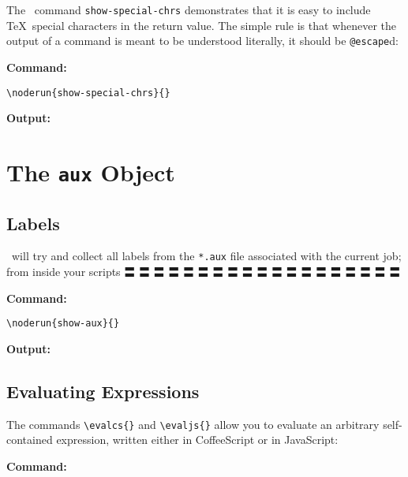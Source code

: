 \documentclass[a4paper]{article}
\makeatletter
\newenvironment{jzrplain}{%
  \lineskiplimit=-10pt%
  \lineskip=0pt%
  \topskip=0pt%
  \setlength{\parskip}{4mm}%
  \setlength{\parindent}{0mm}%
  \leading{4mm}
  }%
  {\par}
\makeatother
\begin{document}
\begin{jzrplain}
The \CXLTX\ command \verb#show-special-chrs# demonstrates that it is easy to include \TeX\ special characters
in the return value. The simple rule is that whenever the output of a command is meant to be understood
literally, it should be \verb#@escape#d:

{\textbf{Command:}}

\begin{verbatim}
\noderun{show-special-chrs}{}
\end{verbatim}

{\textbf{Output:}}



\clearpage\section{The \texttt{aux} Object}\label{aux}



\subsection{Labels}\label{labels}

\CXLTX\ will try and collect all labels from the \verb#*.aux# file associated with the current job; from
inside your scripts 〓 〓 〓 〓 〓 〓 〓 〓 〓 〓 〓 〓 〓 〓 〓 〓 〓 〓 〓

{\textbf{Command:}}

\begin{verbatim}
\noderun{show-aux}{}
\end{verbatim}

{\textbf{Output:}}

{\fontsize{3mm}{3mm}}


\subsection{Evaluating Expressions}\label{evalcs}

The commands \verb#\evalcs{}# and \verb#\evaljs{}# allow you to evaluate an arbitrary self-contained
expression, written either in CoffeeScript or in JavaScript:

{\textbf{Command:}}


\end{jzrplain}
\end{document}

